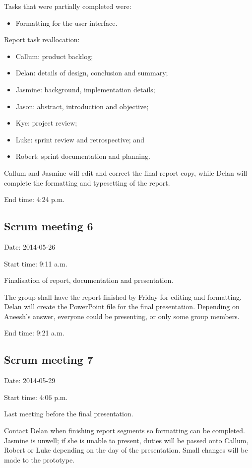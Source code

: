 \documentclass[a4paper,titlepage,12pt]{article}
\begin{document}
Tasks that were partially completed were:

\begin{itemize}
	\item Formatting for the user interface.
\end{itemize}

Report task reallocation:

\begin{itemize}
	\item Callum: product backlog;
	\item Delan: details of design, conclusion and summary;
	\item Jasmine: background, implementation details;
	\item Jason: abstract, introduction and objective;
	\item Kye: project review;
	\item Luke: sprint review and retrospective; and
	\item Robert: sprint documentation and planning.
\end{itemize}

Callum and Jasmine will edit and correct the final report copy, while Delan
will complete the formatting and typesetting of the report.

End time: 4:24 p.m.

\subsection{Scrum meeting 6}

Date: 2014-05-26

Start time: 9:11 a.m.

Finalisation of report, documentation and presentation.

The group shall have the report finished by Friday for editing and formatting.
Delan will create the PowerPoint file for the final presentation. Depending on
Aneesh's answer, everyone could be presenting, or only some group members.

End time: 9:21 a.m.

\subsection{Scrum meeting 7}

Date: 2014-05-29

Start time: 4:06 p.m.

Last meeting before the final presentation.

Contact Delan when finishing report segments so formatting can be completed.
Jasmine is unwell; if she is unable to present, duties will be passed onto
Callum, Robert or Luke depending on the day of the presentation. Small changes
will be made to the prototype.
\end{document}
